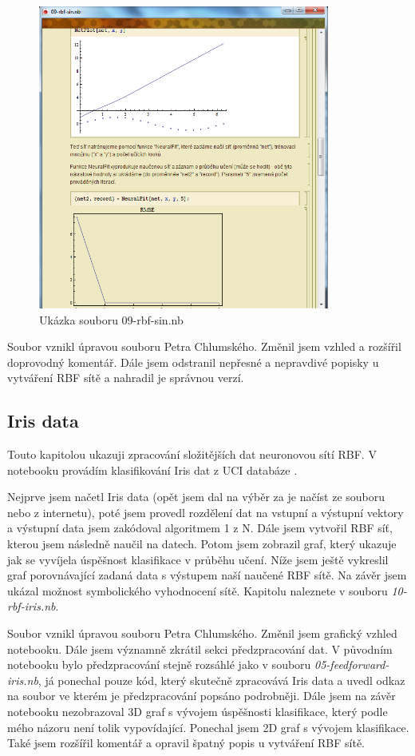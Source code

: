\documentclass[11pt,twoside,a4paper]{book}
\begin{document}
\begin{figure}[h!]
\begin{center}
\includegraphics[height=10cm]{figures/ukazka09.png}
\caption{Ukázka souboru 09-rbf-sin.nb}
\label{fig:rbf-sin}
\end{center}
\end{figure}

Soubor vznikl úpravou souboru Petra Chlumského.\cite{chlumsky} Změnil jsem vzhled a rozšířil doprovodný komentář. Dále jsem odstranil nepřesné a nepravdivé popisky u vytváření RBF sítě a nahradil je správnou verzí.
\newpage
\subsection{Iris data}
Touto kapitolou ukazuji zpracování složitějších dat neuronovou sítí RBF. V notebooku provádím klasifikování Iris dat z UCI databáze \cite{UCI}.

Nejprve jsem načetl Iris data (opět jsem dal na výběr za je načíst ze souboru nebo z internetu), poté jsem provedl rozdělení dat na vstupní a výstupní vektory a výstupní data jsem zakódoval algoritmem 1 z N. Dále jsem vytvořil RBF síť, kterou jsem následně naučil na datech. Potom jsem zobrazil graf, který ukazuje jak se vyvíjela úspěšnost klasifikace v průběhu učení. Níže jsem ještě vykreslil graf porovnávající zadaná data s výstupem naší naučené RBF sítě. Na závěr jsem ukázal možnost symbolického vyhodnocení sítě. Kapitolu naleznete v souboru \textit{10-rbf-iris.nb}.

Soubor vznikl úpravou souboru Petra Chlumského.\cite{chlumsky} Změnil jsem grafický vzhled notebooku. Dále jsem významně zkrátil sekci předzpracování dat. V původním notebooku bylo předzpracování stejně rozsáhlé jako v souboru \textit{05-feedforward-iris.nb}, já ponechal pouze kód, který skutečně zpracovává Iris data a uvedl odkaz na soubor ve kterém je předzpracování popsáno podrobněji. Dále jsem na závěr notebooku nezobrazoval 3D graf s vývojem úspěšnosti klasifikace, který podle mého názoru není tolik vypovídající. Ponechal jsem 2D graf s vývojem klasifikace. Také jsem rozšířil komentář a opravil špatný popis u vytváření RBF sítě.
\end{document}
